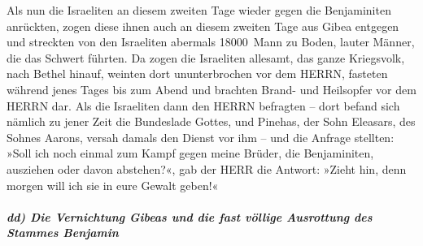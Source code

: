 Als nun die Israeliten an diesem zweiten Tage wieder
gegen die Benjaminiten anrückten, zogen diese ihnen auch
an diesem zweiten Tage aus Gibea entgegen und streckten von den
Israeliten abermals 18000~Mann zu Boden, lauter Männer, die das Schwert
führten. Da zogen die Israeliten allesamt, das ganze
Kriegsvolk, nach Bethel hinauf, weinten dort ununterbrochen vor dem
HERRN, fasteten während jenes Tages bis zum Abend und brachten Brand-
und Heilsopfer vor dem HERRN dar. Als die Israeliten dann
den HERRN befragten -- dort befand sich nämlich zu jener Zeit die
Bundeslade Gottes, und Pinehas, der Sohn Eleasars, des
Sohnes Aarons, versah damals den Dienst vor ihm -- und die Anfrage
stellten: »Soll ich noch einmal zum Kampf gegen meine Brüder, die
Benjaminiten, ausziehen oder davon abstehen?«, gab der HERR die Antwort:
»Zieht hin, denn morgen will ich sie in eure Gewalt geben!«

\hypertarget{dd-die-vernichtung-gibeas-und-die-fast-vuxf6llige-ausrottung-des-stammes-benjamin}{%
\subparagraph{dd) Die Vernichtung Gibeas und die fast völlige Ausrottung
des Stammes
Benjamin}\label{dd-die-vernichtung-gibeas-und-die-fast-vuxf6llige-ausrottung-des-stammes-benjamin}}

